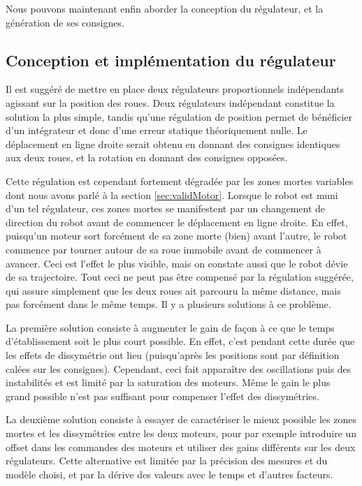 Nous pouvons maintenant enfin aborder la conception du régulateur, et la génération de ses consignes.

\subsection{Conception et implémentation du régulateur}
Il est suggéré de mettre en place deux régulateurs proportionnels indépendants agissant sur la position des roues. Deux régulateurs indépendant constitue la solution la plus simple, tandis qu'une régulation de position permet de bénéficier d'un intégrateur et donc d'une erreur statique théoriquement nulle. Le déplacement en ligne droite serait obtenu en donnant des consignes identiques aux deux roues, et la rotation en donnant des consignes opposées.

Cette régulation est cependant fortement dégradée par les zones mortes variables dont nous avons parlé à la section \ref{sec:validMotor}. Lorsque le robot est muni d'un tel régulateur, ces zones mortes se manifestent par un changement de direction du robot avant de commencer le déplacement en ligne droite. En effet, puisqu'un moteur sort forcément de sa zone morte (bien) avant l'autre, le robot commence par tourner autour de sa roue immobile avant de commencer à avancer. Ceci est l'effet le plus visible, mais on constate aussi que le robot dévie de sa trajectoire. Tout ceci ne peut pas être compensé par la régulation suggérée, qui assure simplement que les deux roues ait parcouru la même distance, mais pas forcément dans le même temps. Il y a plusieurs solutions à ce problème.

La première solution consiste à augmenter le gain de façon à ce que le temps d'établissement soit le plus court possible. En effet, c'est pendant cette durée que les effets de dissymétrie ont lieu (puisqu'après les positions sont par définition calées sur les consignes). Cependant, ceci fait apparaître des oscillations puis des instabilités et est limité par la saturation des moteurs. Même le gain le plus grand possible n'est pas suffisant pour compenser l'effet des dissymétries.

La deuxième solution consiste à essayer de caractériser le mieux possible les zones mortes et les dissymétries entre les deux moteurs, pour par exemple introduire un offset dans les commandes des moteurs et utiliser des gains différents sur les deux régulateurs. Cette alternative est limitée par la précision des mesures et du modèle choisi, et par la dérive des valeurs avec le temps et d'autres facteurs.

